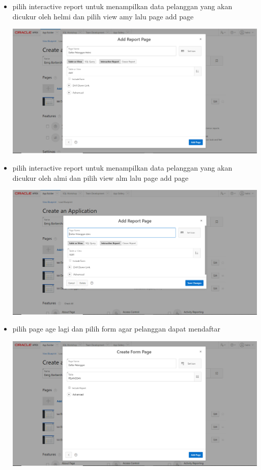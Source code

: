 ﻿\documentclass{article}
\begin{document}
\begin{itemize}
        \item pilih interactive report untuk menampilkan data pelanggan yang akan dicukur oleh helmi dan pilih view amy lalu page add page 
        \begin{center}
            \centering
            \includegraphics[scale=0.3]{gambar/12.PNG}
        \end{center}
        
         \item pilih interactive report untuk menampilkan data pelanggan yang akan dicukur oleh almi dan pilih view alm lalu page add page 
        \begin{center}
            \centering
            \includegraphics[scale=0.3]{gambar/13.PNG}
        \end{center}
        
        \item pilih page age lagi dan pilih form agar pelanggan dapat mendaftar 
        \begin{center}
            \centering
            \includegraphics[scale=0.3]{gambar/14.PNG}
        \end{center}
        

\end{itemize}
\end{document}
